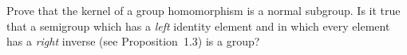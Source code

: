 Prove that the kernel of a group homomorphism is a normal subgroup.
Is it true that a semigroup which has a \textit{left} identity element and in
which every element has a \textit{right} inverse (see Proposition~1.3) is a group?